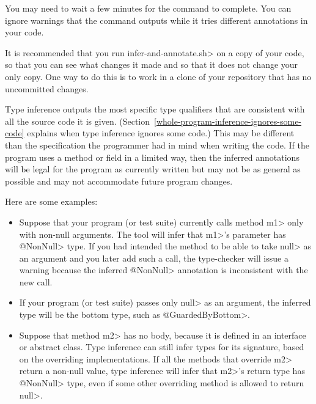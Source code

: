 You may need to wait a few minutes for the command to complete.
You can ignore warnings that the command outputs while it tries different
annotations in your code.

It is recommended that you run \<infer-and-annotate.sh> on a copy of your
code, so that you can see what changes it made and so that it does not
change your only copy.  One way to do this is to work in a clone of your
repository that has no uncommitted changes.



Type inference outputs the most specific type qualifiers that are
consistent with all the source code it is given.
(Section~\ref{whole-program-inference-ignores-some-code}
explains when type inference ignores some code.)
This may be different than the specification the programmer had in mind
when writing the code.
If the program uses a method or field in a limited way, then the inferred
annotations will be legal for the program as
currently written but may not be as general as possible and may not
accommodate future program changes.

Here are some examples:

\begin{itemize}
\item
Suppose that your program (or test suite) currently calls
method \<m1> only with non-null
arguments.  The tool will infer that \<m1>'s parameter has
\<@NonNull> type.  If you had intended the method to be able to
take \<null> as an argument and you later add such a call, the type-checker
will issue a warning because the inferred \<@NonNull>
annotation is inconsistent with the new call.

\item
If your program (or test suite) passes only \<null> as an argument, the
inferred type will be the bottom type, such as \<@GuardedByBottom>.

\item
Suppose that method \<m2> has no body, because it is defined in an interface or
abstract class.
Type inference can still infer types for its signature, based on the
overriding implementations.
If all the methods that override \<m2> return a non-null value, type
inference will infer that \<m2>'s return type has \<@NonNull> type, even if
some other overriding method is allowed to return
\<null>.

\end{itemize}

